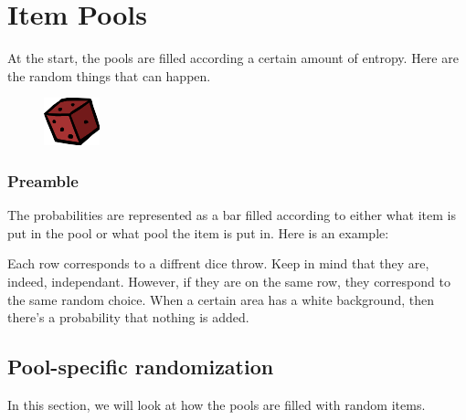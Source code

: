 \section{Item Pools}\label{sec:itempools}

At the start, the pools are filled according a certain amount of entropy. Here are the random things that can happen.

\begin{figure}
   \begin{center}
      \includegraphics{img/D6.png}
   \end{center}
\end{figure}


\subsubsection*{Preamble}

The probabilities are represented as a bar filled according to either what item is put in the pool or what pool the item is put in. Here is an example: 
\begin{table}[H]
\end{table}
Each row corresponds to a diffrent dice throw. Keep in mind that they are, indeed, independant. However, if they are on the same row, they correspond to the same random choice. When a certain area has a white background, then there's a probability that nothing is added.


\subsection{Pool-specific randomization}
In this section, we will look at how the pools are filled with random items.

